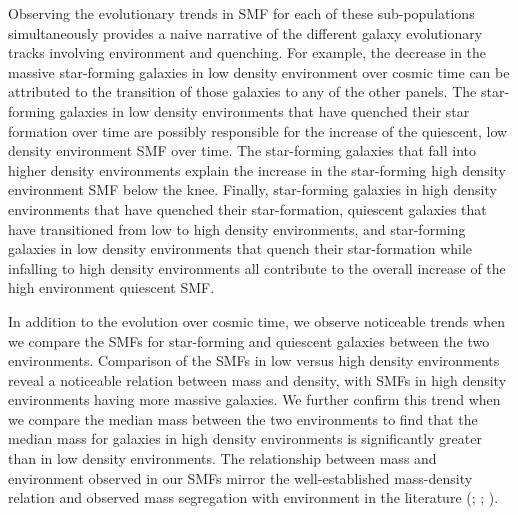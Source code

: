 \documentclass{emulateapj}
\begin{document}
Observing the evolutionary trends in SMF for each of these sub-populations simultaneously provides a naive narrative of the different galaxy evolutionary tracks involving environment and quenching. For example, the decrease in the massive star-forming galaxies in low density environment over cosmic time can be attributed to the transition of those galaxies to any of the other panels. The star-forming galaxies in low density environments that have quenched their star formation over time are possibly responsible for the increase of the quiescent, low density environment SMF over time. The star-forming galaxies that fall into higher density environments explain the increase in the star-forming high density environment SMF below the knee. Finally, star-forming galaxies in high density environments that have quenched their star-formation, quiescent galaxies that have transitioned from low to high density environments, and star-forming galaxies in low density environments that quench their star-formation while infalling to high density environments all contribute to the overall increase of the high environment quiescent SMF.

In addition to the evolution over cosmic time, we observe noticeable trends when we compare the SMFs for star-forming and quiescent galaxies between the two environments. Comparison of the SMFs in low versus high density environments reveal a noticeable relation between mass and density, with SMFs in high density environments having more massive galaxies. We further confirm this trend when we compare the median mass between the two environments to find that the median mass for galaxies in high density environments is significantly greater than in low density environments. The relationship between mass and environment observed in our SMFs mirror the well-established mass-density relation and observed mass segregation with environment in the literature (\cite{bundy06a}; \cite{Scodeggio:2009aa}; \cite{Bolzonella:2010aa}).
\end{document}
